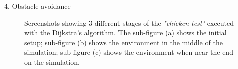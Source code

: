 \documentclass[10pt,a4paper]{article}
\begin{document}
\begin{task}{4, Obstacle avoidance}
\begin{figure}[H]
    \centering
    \hfill
    \hfill
    \caption{Screenshots showing 3 different stages of the \textit{"chicken test"} executed with the Dijkstra's algorithm. The sub-figure (a) shows the initial setup; sub-figure (b) shows the environment in the middle of the simulation; sub-figure (c) shows the environment when near the end on the simulation.}
    \label{fig:chicken-dijkstra}
\end{figure}


\end{task}
\end{document}

